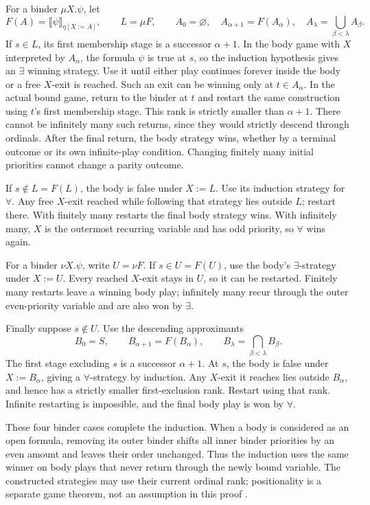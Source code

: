 For a binder \(\mu X.\psi\), let
\[
 F(A)=\llbracket\psi\rrbracket_{\eta[X:=A]},
 \qquad L=\mu F,
 \qquad A_0=\varnothing,\quad
 A_{\alpha+1}=F(A_\alpha),\quad
 A_\lambda=\bigcup_{\beta<\lambda}A_\beta.
\]
If \(s\in L\), its first membership stage
is a successor \(\alpha+1\). In the body
game with \(X\) interpreted by \(A_\alpha\),
the formula \(\psi\) is true at \(s\), so
the induction hypothesis gives an \(\exists\)
winning strategy. Use it until either play
continues forever inside the body or a free
\(X\)-exit is reached.
Such an exit can be winning only at
\(t\in A_\alpha\). In the actual bound game,
return to the binder at \(t\) and restart
the same construction using \(t\)'s first
membership stage. This rank is strictly
smaller than \(\alpha+1\).
There cannot be infinitely many such returns,
since they would strictly descend through
ordinals. After the final return, the body
strategy wins, whether by a terminal outcome
or its own infinite-play condition.
Changing finitely many initial priorities
cannot change a parity outcome.

If \(s\notin L=F(L)\), the body is false
under \(X:=L\). Use its induction strategy
for \(\forall\). Any free \(X\)-exit reached
while following that strategy lies outside
\(L\); restart there. With finitely many
restarts the final body strategy wins.
With infinitely many, \(X\) is the outermost
recurring variable and has odd priority,
so \(\forall\) wins again.

For a binder \(\nu X.\psi\), write \(U=\nu F\).
If \(s\in U=F(U)\), use the body's
\(\exists\)-strategy under \(X:=U\).
Every reached \(X\)-exit stays in \(U\),
so it can be restarted. Finitely many
restarts leave a winning body play;
infinitely many recur through the outer
even-priority variable and are also won
by \(\exists\).

Finally suppose \(s\notin U\). Use the
descending approximants
\[
 B_0=S,\qquad B_{\alpha+1}=F(B_\alpha),
 \qquad B_\lambda=\bigcap_{\beta<\lambda}B_\beta.
\]
The first stage excluding \(s\) is a
successor \(\alpha+1\). At \(s\), the body
is false under \(X:=B_\alpha\), giving a
\(\forall\)-strategy by induction.
Any \(X\)-exit it reaches lies outside
\(B_\alpha\), and hence has a strictly
smaller first-exclusion rank. Restart
using that rank. Infinite restarting
is impossible, and the final body play
is won by \(\forall\).

These four binder cases complete the
induction. When a body is considered as
an open formula, removing its outer binder
shifts all inner binder priorities by an
even amount and leaves their order unchanged.
Thus the induction uses the same winner
on body plays that never return through
the newly bound variable. The constructed
strategies may use their current ordinal
rank; positionality is a separate game
theorem, not an assumption in this proof
\cite[\S4.4, thm.~4.6]{BradfieldStirling2007}.

